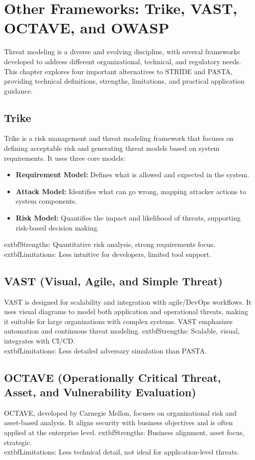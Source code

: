 
\section*{Other Frameworks: Trike, VAST, OCTAVE, and OWASP}
Threat modeling is a diverse and evolving discipline, with several frameworks developed to address different organizational, technical, and regulatory needs. This chapter explores four important alternatives to STRIDE and PASTA, providing technical definitions, strengths, limitations, and practical application guidance\cite{owasp,nist800154}.

\subsection*{Trike}
Trike is a risk management and threat modeling framework that focuses on defining acceptable risk and generating threat models based on system requirements. It uses three core models:\cite{uceda2015}
\begin{itemize}
	\item \textbf{Requirement Model:} Defines what is allowed and expected in the system.
	\item \textbf{Attack Model:} Identifies what can go wrong, mapping attacker actions to system components.
	\item \textbf{Risk Model:} Quantifies the impact and likelihood of threats, supporting risk-based decision making.
\end{itemize}
	extbf{Strengths:} Quantitative risk analysis, strong requirements focus.\\
	extbf{Limitations:} Less intuitive for developers, limited tool support.

\subsection*{VAST (Visual, Agile, and Simple Threat)}
VAST is designed for scalability and integration with agile/DevOps workflows. It uses visual diagrams to model both application and operational threats, making it suitable for large organizations with complex systems. VAST emphasizes automation and continuous threat modeling.\cite{owasp}
	extbf{Strengths:} Scalable, visual, integrates with CI/CD.\\
	extbf{Limitations:} Less detailed adversary simulation than PASTA.

\subsection*{OCTAVE (Operationally Critical Threat, Asset, and Vulnerability Evaluation)}
OCTAVE, developed by Carnegie Mellon, focuses on organizational risk and asset-based analysis. It aligns security with business objectives and is often applied at the enterprise level.\cite{nist800154}
	extbf{Strengths:} Business alignment, asset focus, strategic.\\
	extbf{Limitations:} Less technical detail, not ideal for application-level threats.

